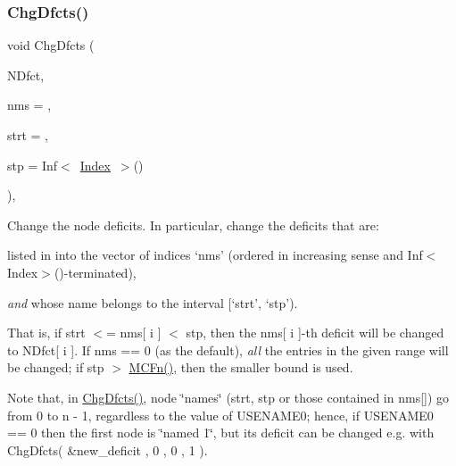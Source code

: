\subsubsection{\texorpdfstring{Chg\+Dfcts()}{ChgDfcts()}}
{\footnotesize\ttfamily void Chg\+Dfcts (\begin{DoxyParamCaption}\item[{\mbox{\hyperlink{class_m_c_f_class_ad325f3193dbba0ddef1da4e72d29eda6}{c\+F\+Row}}}]{N\+Dfct,  }\item[{\mbox{\hyperlink{class_m_c_f_class_a81575b2d4e4d5636b17170432150ae69}{c\+Index\+\_\+\+Set}}}]{nms = {},  }\item[{\mbox{\hyperlink{class_m_c_f_class_a76aaabb20535c51a2752b93f6c38fe54}{c\+Index}}}]{strt = {},  }\item[{\mbox{\hyperlink{class_m_c_f_class_ad53d6229d7ec28555a9c9c2fd9abf773}{Index}}}]{stp = {\ttfamily Inf$<$~\mbox{\hyperlink{class_m_c_f_class_ad53d6229d7ec28555a9c9c2fd9abf773}{Index}}~$>$()} }\end{DoxyParamCaption})\hspace{0.3cm}{\ttfamily [override]}, {\ttfamily [virtual]}}

Change the node deficits. In particular, change the deficits that are\+:


\begin{DoxyItemize}
\item listed in into the vector of indices `nms' (ordered in increasing sense and Inf$<$\+Index$>$()-\/terminated),
\item {\itshape and} whose name belongs to the interval \mbox{[}`strt', `stp').
\end{DoxyItemize}

That is, if strt $<$= nms\mbox{[} i \mbox{]} $<$ stp, then the nms\mbox{[} i \mbox{]}-\/th deficit will be changed to N\+Dfct\mbox{[} i \mbox{]}. If nms == 0 (as the default), {\itshape all} the entries in the given range will be changed; if stp $>$ \mbox{\hyperlink{class_m_c_f_class_a6438187f454e795c03a850bfab31be84}{M\+C\+Fn()}}, then the smaller bound is used.

Note that, in \mbox{\hyperlink{class_s_p_tree_a6e7e9247b7aecfa1934da70f2e525295}{Chg\+Dfcts()}}, node \char`\"{}names\char`\"{} (strt, stp or those contained in nms\mbox{[}\mbox{]}) go from 0 to n -\/ 1, regardless to the value of U\+S\+E\+N\+A\+M\+E0; hence, if U\+S\+E\+N\+A\+M\+E0 == 0 then the first node is \char`\"{}named 1\char`\"{}, but its deficit can be changed e.\+g. with Chg\+Dfcts( \&new\+\_\+deficit , 0 , 0 , 1 ).

